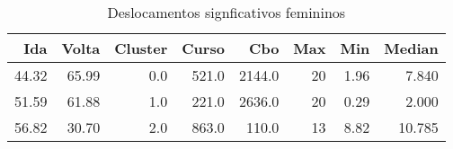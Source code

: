 \begin{table}
\centering
\caption{Deslocamentos signficativos femininos}
\label{tab:Salarios_Desequlibrio_F}
\begin{tabular}{rrrrrrrr}
\toprule
  Ida &  Volta &  Cluster &  Curso &    Cbo &  Max &  Min &  Median \\
\midrule
44.32 &  65.99 &      0.0 &  521.0 & 2144.0 &   20 & 1.96 &   7.840 \\
51.59 &  61.88 &      1.0 &  221.0 & 2636.0 &   20 & 0.29 &   2.000 \\
56.82 &  30.70 &      2.0 &  863.0 &  110.0 &   13 & 8.82 &  10.785 \\
\bottomrule
\end{tabular}
\end{table}
